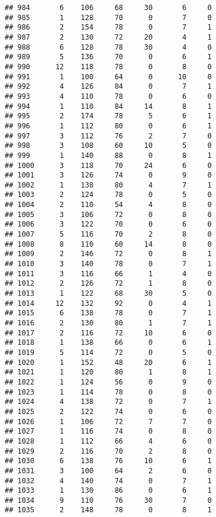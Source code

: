 \documentclass[
]{article}
\begin{document}
\begin{verbatim}
## 984       6    106     68     30       6     0
## 985       1    128     70      0       7     0
## 986       2    154     78      0       7     1
## 987       2    130     72     20       4     1
## 988       6    128     78     30       4     0
## 989       5    136     70      0       6     1
## 990      12    118     78      0       8     0
## 991       1    100     64      0      10     0
## 992       4    126     84      0       7     1
## 993       4    110     78      0       6     0
## 994       1    110     84     14       8     1
## 995       2    174     78      5       6     1
## 996       1    112     80      0       6     1
## 997       3    112     76      2       7     0
## 998       3    108     60     10       5     0
## 999       1    140     88      0       8     1
## 1000      3    118     70     24       6     0
## 1001      3    126     74      0       9     0
## 1002      1    138     80      4       7     1
## 1003      2    124     78      0       5     0
## 1004      2    110     54      4       8     0
## 1005      3    106     72      0       8     0
## 1006      3    122     70      0       6     0
## 1007      5    116     70      2       8     0
## 1008      8    110     60     14       8     0
## 1009      2    146     72      0       8     1
## 1010      3    140     78      0       7     1
## 1011      3    116     66      1       4     0
## 1012      2    126     72      1       8     0
## 1013      1    122     68     30       5     0
## 1014     12    132     92      0       4     1
## 1015      6    138     78      0       7     1
## 1016      2    130     80      1       7     1
## 1017      2    116     72     10       6     0
## 1018      1    138     66      0       6     1
## 1019      5    114     72      0       5     0
## 1020      1    152     48     20       6     1
## 1021      1    120     80      1       8     1
## 1022      1    124     56      0       9     0
## 1023      1    114     78      0       8     0
## 1024      4    138     72      0       7     1
## 1025      2    122     74      0       6     0
## 1026      1    106     72      7       7     0
## 1027      1    116     74      0       8     0
## 1028      1    112     66      4       6     0
## 1029      2    116     70      2       8     0
## 1030      6    138     76     10       6     1
## 1031      3    100     64      2       6     0
## 1032      4    140     74      0       7     1
## 1033      1    130     86      0       6     1
## 1034      9    110     76     30       7     0
## 1035      2    148     78      0       8     1

\end{verbatim}
\end{document}
